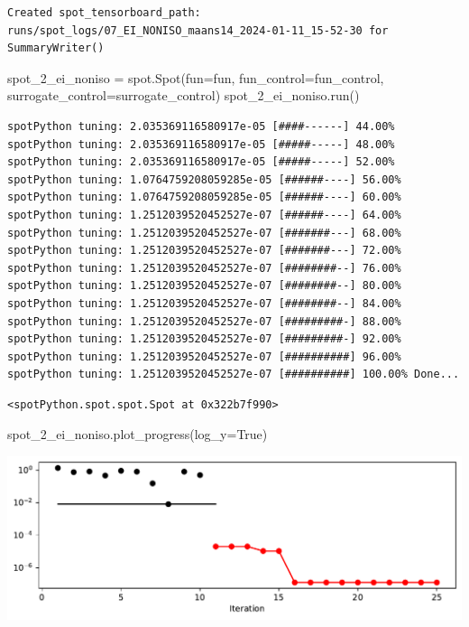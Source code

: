 \documentclass[
  letterpaper,
  DIV=11,
  numbers=noendperiod]{scrreprt}
\newenvironment{Shaded}{\begin{snugshade}}{\end{snugshade}}
\newcommand{\NormalTok}[1]{\textcolor[rgb]{0.00,0.23,0.31}{#1}}
\newcommand{\OperatorTok}[1]{\textcolor[rgb]{0.37,0.37,0.37}{#1}}
\newcommand{\VariableTok}[1]{\textcolor[rgb]{0.07,0.07,0.07}{#1}}
\begin{document}
\begin{verbatim}
Created spot_tensorboard_path: runs/spot_logs/07_EI_NONISO_maans14_2024-01-11_15-52-30 for SummaryWriter()
\end{verbatim}

\begin{Shaded}
\begin{Highlighting}[]
\NormalTok{spot\_2\_ei\_noniso }\OperatorTok{=}\NormalTok{ spot.Spot(fun}\OperatorTok{=}\NormalTok{fun,}
\NormalTok{                   fun\_control}\OperatorTok{=}\NormalTok{fun\_control,}
\NormalTok{                   surrogate\_control}\OperatorTok{=}\NormalTok{surrogate\_control)}
\NormalTok{spot\_2\_ei\_noniso.run()}
\end{Highlighting}
\end{Shaded}

\begin{verbatim}
spotPython tuning: 2.035369116580917e-05 [####------] 44.00% 
spotPython tuning: 2.035369116580917e-05 [#####-----] 48.00% 
spotPython tuning: 2.035369116580917e-05 [#####-----] 52.00% 
spotPython tuning: 1.0764759208059285e-05 [######----] 56.00% 
spotPython tuning: 1.0764759208059285e-05 [######----] 60.00% 
spotPython tuning: 1.2512039520452527e-07 [######----] 64.00% 
spotPython tuning: 1.2512039520452527e-07 [#######---] 68.00% 
spotPython tuning: 1.2512039520452527e-07 [#######---] 72.00% 
spotPython tuning: 1.2512039520452527e-07 [########--] 76.00% 
spotPython tuning: 1.2512039520452527e-07 [########--] 80.00% 
spotPython tuning: 1.2512039520452527e-07 [########--] 84.00% 
spotPython tuning: 1.2512039520452527e-07 [#########-] 88.00% 
spotPython tuning: 1.2512039520452527e-07 [#########-] 92.00% 
spotPython tuning: 1.2512039520452527e-07 [##########] 96.00% 
spotPython tuning: 1.2512039520452527e-07 [##########] 100.00% Done...
\end{verbatim}

\begin{verbatim}
<spotPython.spot.spot.Spot at 0x322b7f990>
\end{verbatim}

\begin{Shaded}
\begin{Highlighting}[]
\NormalTok{spot\_2\_ei\_noniso.plot\_progress(log\_y}\OperatorTok{=}\VariableTok{True}\NormalTok{)}
\end{Highlighting}
\end{Shaded}

\includegraphics{012_num_spot_ei_files/figure-pdf/cell-14-output-1.pdf}
\end{document}
